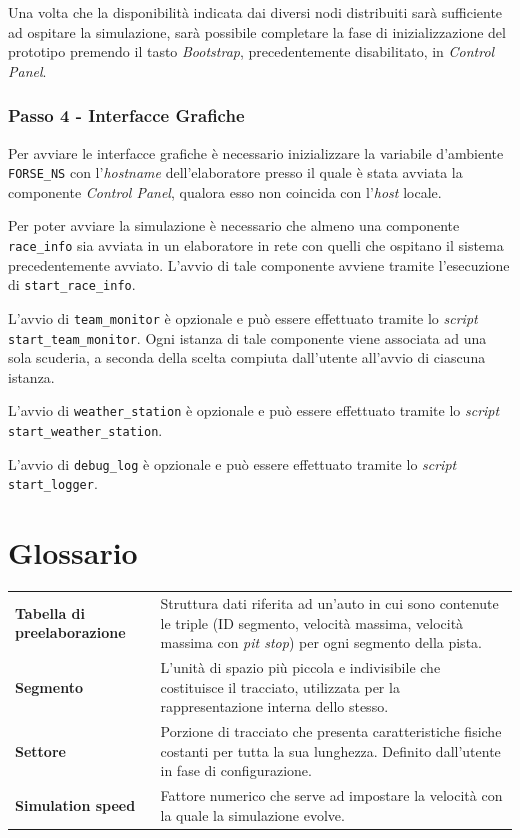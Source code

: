 \documentclass[a4paper]{report}
\newcommand{\term}[2]{\textbf{#1} & #2 \\}
\begin{document}
Una volta che la disponibilità indicata dai diversi nodi distribuiti sarà sufficiente ad ospitare la simulazione, sarà possibile completare la fase di inizializzazione del prototipo premendo il tasto \textsl{Bootstrap}, precedentemente disabilitato, in \textsl{Control Panel}.

\subsection*{Passo 4 - Interfacce Grafiche}
Per avviare le interfacce grafiche è necessario inizializzare la variabile d'ambiente \texttt{FORSE\_NS} con l'\textit{hostname} dell'elaboratore presso il quale è stata avviata la componente \textsl{Control Panel}, qualora esso non coincida con l'\textit{host} locale.

Per poter avviare la simulazione è necessario che almeno una componente \texttt{race\_info} sia avviata in un elaboratore in rete con quelli che ospitano il sistema precedentemente avviato. L'avvio di tale componente avviene tramite l'esecuzione di \texttt{start\_race\_info}.

L'avvio di \texttt{team\_monitor} è opzionale e può essere effettuato tramite lo \textit{script} \texttt{start\_team\_monitor}. Ogni istanza di tale componente viene associata ad una sola scuderia, a seconda della scelta compiuta dall'utente all'avvio di ciascuna istanza.

L'avvio di \texttt{weather\_station} è opzionale e può essere effettuato tramite lo \textit{script} \texttt{start\_weather\_station}.

L'avvio di \texttt{debug\_log} è opzionale e può essere effettuato tramite lo \textit{script} \texttt{start\_logger}.

\chapter{Glossario}

\begin{tabularx}{\textwidth}{lX}
\term{Tabella di preelaborazione}{Struttura dati riferita ad un'auto in cui sono contenute le triple (ID segmento, velocità massima, velocità massima con \textit{pit stop}) per ogni segmento della pista.}
\term{Segmento}{L'unità di spazio più piccola e indivisibile che costituisce il tracciato, utilizzata per la rappresentazione interna dello stesso.}
\term{Settore}{Porzione di tracciato che presenta caratteristiche fisiche costanti per tutta la sua lunghezza. Definito dall'utente in fase di configurazione.}
\term{Simulation speed}{Fattore numerico che serve ad impostare la velocità con la quale la simulazione evolve.}
\end{tabularx}
\end{document}

